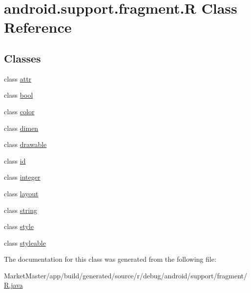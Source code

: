 \hypertarget{classandroid_1_1support_1_1fragment_1_1R}{}\section{android.\+support.\+fragment.\+R Class Reference}
\label{classandroid_1_1support_1_1fragment_1_1R}
\subsection*{Classes}
\begin{DoxyCompactItemize}
\item 
class \mbox{\hyperlink{classandroid_1_1support_1_1fragment_1_1R_1_1attr}{attr}}
\item 
class \mbox{\hyperlink{classandroid_1_1support_1_1fragment_1_1R_1_1bool}{bool}}
\item 
class \mbox{\hyperlink{classandroid_1_1support_1_1fragment_1_1R_1_1color}{color}}
\item 
class \mbox{\hyperlink{classandroid_1_1support_1_1fragment_1_1R_1_1dimen}{dimen}}
\item 
class \mbox{\hyperlink{classandroid_1_1support_1_1fragment_1_1R_1_1drawable}{drawable}}
\item 
class \mbox{\hyperlink{classandroid_1_1support_1_1fragment_1_1R_1_1id}{id}}
\item 
class \mbox{\hyperlink{classandroid_1_1support_1_1fragment_1_1R_1_1integer}{integer}}
\item 
class \mbox{\hyperlink{classandroid_1_1support_1_1fragment_1_1R_1_1layout}{layout}}
\item 
class \mbox{\hyperlink{classandroid_1_1support_1_1fragment_1_1R_1_1string}{string}}
\item 
class \mbox{\hyperlink{classandroid_1_1support_1_1fragment_1_1R_1_1style}{style}}
\item 
class \mbox{\hyperlink{classandroid_1_1support_1_1fragment_1_1R_1_1styleable}{styleable}}
\end{DoxyCompactItemize}


The documentation for this class was generated from the following file\+:\begin{DoxyCompactItemize}
\item 
Market\+Master/app/build/generated/source/r/debug/android/support/fragment/\mbox{\hyperlink{debug_2android_2support_2fragment_2R_8java}{R.\+java}}\end{DoxyCompactItemize}

